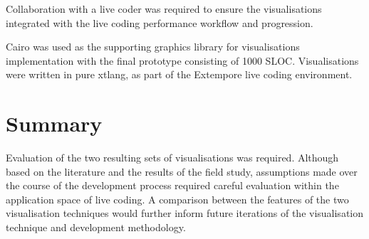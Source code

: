 Collaboration with a live coder was required to ensure the visualisations integrated with the live coding performance workflow and progression.

Cairo was used as the supporting graphics library for visualisations implementation with the final prototype consisting of 1000 \ac{SLOC}. Visualisations were written in pure xtlang, as part of the Extempore live coding environment.

\more


\section{Summary}

Evaluation of the two resulting sets of visualisations was required. Although based on the literature and the results of the field study, assumptions made over the course of the development process required careful evaluation within the application space of live coding. A comparison between the features of the two visualisation techniques would further inform future iterations of the visualisation technique and development methodology.